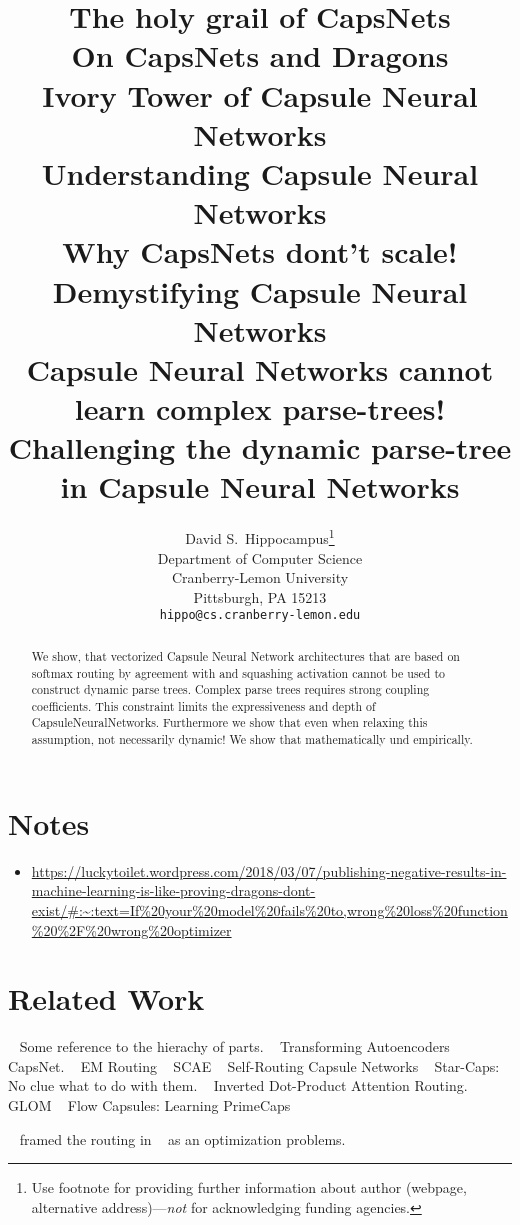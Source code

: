 \documentclass{article}
\title{
	The holy grail of CapsNets \\
	On CapsNets and Dragons \\
	Ivory Tower of Capsule Neural Networks \\
	Understanding Capsule Neural Networks \\
	Why CapsNets dont't scale! \\
	Demystifying Capsule Neural Networks \\
	Capsule Neural Networks cannot learn complex parse-trees! \\
	Challenging the dynamic parse-tree in Capsule Neural Networks}
\author{%
  David S.~Hippocampus\thanks{Use footnote for providing further information
    about author (webpage, alternative address)---\emph{not} for acknowledging
    funding agencies.} \\
  Department of Computer Science\\
  Cranberry-Lemon University\\
  Pittsburgh, PA 15213 \\
  \texttt{hippo@cs.cranberry-lemon.edu} \\
}
\begin{document}
\maketitle

\begin{abstract}
  We show, that vectorized Capsule Neural Network architectures that are based on softmax routing by agreement with and squashing activation cannot be used to construct dynamic parse trees.
  Complex parse trees requires strong coupling coefficients. This constraint limits the expressiveness and depth of CapsuleNeuralNetworks. Furthermore we show that even when relaxing this assumption, not necessarily dynamic!
  We show that mathematically und empirically.
\end{abstract}

\section{Notes}
\begin{itemize}
	\item \url{https://luckytoilet.wordpress.com/2018/03/07/publishing-negative-results-in-machine-learning-is-like-proving-dragons-dont-exist/#:~:text=If%20your%20model%20fails%20to,wrong%20loss%20function%20%2F%20wrong%20optimizer}
\end{itemize}

\section{Related Work}

~\cite{cogsci/Hinton79} Some reference to the hierachy of parts.
~\cite{icann/HintonKW11} Transforming Autoencoders
~\cite{nips/SabourFH17} CapsNet.
~\cite{iclr/HintonSF18} EM Routing
~\cite{nips/KosiorekSTH19} SCAE
~\cite{nips/HahnPK19} Self-Routing Capsule Networks
~\cite{nips/AhmedT19} Star-Caps: No clue what to do with them.
~\cite{iclr/TsaiSGS20} Inverted Dot-Product Attention Routing.
~\cite{corr/Hinton2021} GLOM
~\cite{icml/SabourTYHF21} Flow Capsules: Learning PrimeCaps


~\cite{iclr/Wang018} framed the routing in ~\cite{nips/SabourFH17} as an optimization problems.
\end{document}

